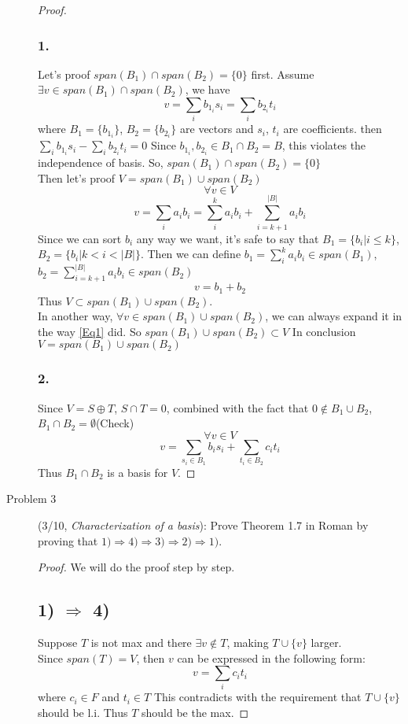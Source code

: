 \documentclass{article}
\begin{document}
\begin{description}
\begin{proof}
		\subsubsection*{1.}
			Let's proof $span(B_1) \cap span(B_2) = \{0\}$ first.
			Assume $\exists v \in span(B_1) \cap span(B_2)$, we have 
			\begin{equation}\label{Eq1}
			 v = \sum_i b_{1_i} s_i = \sum_i b_{2_i} t_i 
			\end{equation}
			where $B_1 = \{b_{1_i}\}$, $B_2 = \{b_{2_i}\}$ are vectors and $s_i$, $t_i$ are coefficients.
			then $\sum_i b_{1_i} s_i - \sum_i b_{2_i} t_i = 0$
			Since $b_{1_i}, b_{2_i} \in B_1 \cap B_2 = B$, this violates the independence of basis.
			So, $span(B_1) \cap span(B_2) = \{0\}$
			\\
			Then let's proof $V = span(B_1) \cup span(B_2)$
			$$ \forall v \in V $$
			$$ v = \sum_i a_i b_i = \sum_i^k a_i b_i + \sum_{i=k+1}^{|B|} a_i b_i$$
			Since we can sort $b_i$ any way we want, it's safe to say that $B_1=\{b_i | i \leqslant k \}$, $B_2 = \{b_i | k < i < |B|\}$.
			Then we can define $b_1 = \sum_i^k a_i b_i \in span(B_1)$, $b_2 = \sum_{i=k+1}^{|B|} a_i b_i \in span(B_2)$
			$$ v = b_1 + b_2 $$
			Thus $V \subset span(B_1) \cup span(B_2)$. \\
			In another way, $ \forall v \in span(B_1) \cup span(B_2)$, we can always expand it in the way \ref{Eq1} did. So $span(B_1) \cup span(B_2) \subset V$
			In conclusion $V = span(B_1) \cup span(B_2)$
		\subsubsection*{2.}
			Since $V=S\oplus T$, $S \cap T = {0}$, combined with the fact that $0 \notin B_1 \cup B_2$, $B_1 \cap B_2 = \emptyset$(Check)\\
			$$\forall v \in V$$
			$$v = \sum_{s_i \in B_1}b_is_i + \sum_{t_i \in B_2} c_it_i$$
			Thus $B_1 \cap B_2$ is a basis for $V$.



	\end{proof}


	\item[Problem 3](3/10, \textit{Characterization of a basis}):
	Prove Theorem 1.7 in Roman by proving that $1)\Rightarrow 4)\Rightarrow 3)\Rightarrow 2)\Rightarrow 1)$.
	\begin{proof}
		We will do the proof step by step.
		\subsection*{1) $\Rightarrow$ 4)}
			Suppose $T$ is not max and there $\exists v \notin T$, making $T \cup \{v\}$ larger. \\
			Since $span(T) = V$, then $v$ can be expressed in the following form:
			$$ v = \sum_i c_i t_i$$
			where $c_i \in F$ and $t_i \in T$
			This contradicts with the requirement that $T \cup \{v\}$ should be l.i.
			Thus $T$ should be the max.

\end{proof}
\end{description}
\end{document}
